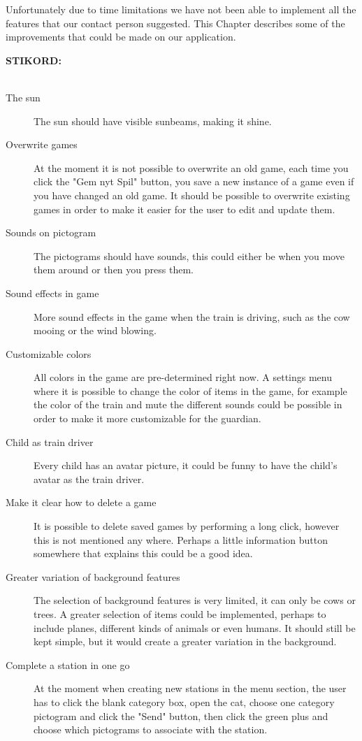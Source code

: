 Unfortunately due to time limitations we have not been able to implement all the features that our contact person suggested. This Chapter describes some of the improvements that could be made on our application.

\textbf{STIKORD:}\\\\

\begin{description}
\item[The sun] The sun should have visible sunbeams, making it shine. 
\item[Overwrite games] At the moment it is not possible to overwrite an old game, each time you click the "Gem nyt Spil" button, you save a new instance of a game even if you have changed an old game. It should be possible to overwrite existing games in order to make it easier for the user to edit and update them.
\item[Sounds on pictogram] The pictograms should have sounds, this could either be when you move them around or then you press them. 
\item[Sound effects in game] More sound effects in the game when the train is driving, such as the cow mooing or the wind blowing. 
\item[Customizable colors] All colors in the game are pre-determined right now. A settings menu where it is possible to change the color of items in the game, for example the color of the train and mute the different sounds could be possible in order to make it more customizable for the guardian.  
\item[Child as train driver] Every child has an avatar picture, it could be funny to have the child's avatar as the train driver. 
\item[Make it clear how to delete a game] It is possible to delete saved games by performing a long click, however this is not mentioned any where. Perhaps a little information button somewhere that explains this could be a good idea. 
\item[Greater variation of background features] The selection of background features is very limited, it can only be cows or trees. A greater selection of items could be implemented, perhaps to include planes, different kinds of animals or even humans. It should still be kept simple, but it would create a greater variation in the background. 
\item[Complete a station in one go] At the moment when creating new stations in the menu section, the user has to click the blank category box, open the \ac{cat}, choose one category pictogram and click the "Send" button, then click the green plus and choose which pictograms to associate with the station.


\end{description}
